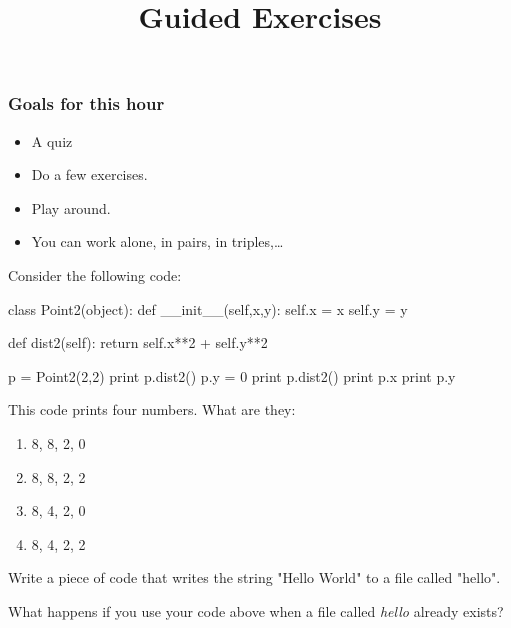 
\title{Guided Exercises}

\frame{\maketitle}

\begin{frame}
\frametitle{Goals for this hour}

\begin{itemize}
\item A quiz
\item Do a few exercises.
\item Play around.
\item You can work alone, in pairs, in triples,\ldots
\end{itemize}

\end{frame}


\begin{frame}[fragile]
{}


Consider the following code:

\begin{python}
class Point2(object):
    def __init__(self,x,y):
        self.x = x
        self.y = y

    def dist2(self):
        return self.x**2 + self.y**2 

p = Point2(2,2)
print p.dist2()
p.y = 0
print p.dist2()
print p.x
print p.y
\end{python}

This code prints four numbers. What are they:

\begin{enumerate}[a]
\item 8, 8, 2, 0
\item 8, 8, 2, 2
\item 8, 4, 2, 0
\item 8, 4, 2, 2
\end{enumerate}

\end{frame}

\begin{frame}[fragile]

Write a piece of code that writes the string "Hello World" to a file called "hello".

\bigskip
What happens if you use your code above when a file called \textit{hello} already exists?

\end{frame}

